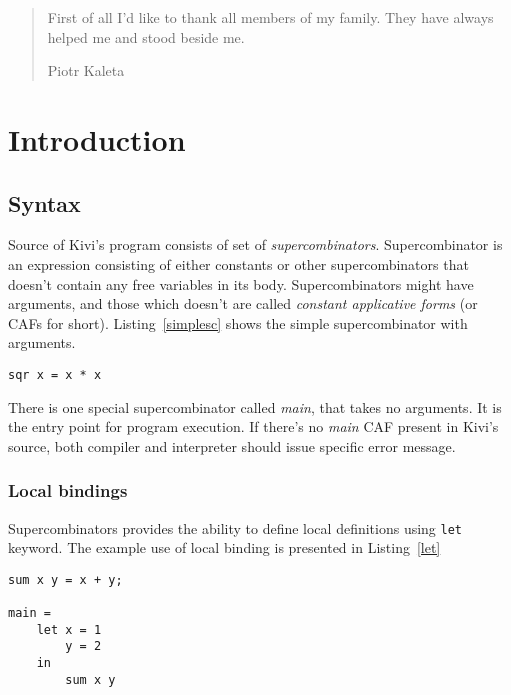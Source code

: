 \documentclass[a4paper]{report}
\begin{document}
\renewcommand{\abstractname}{Acknowledgements}
\begin{abstract}
\normalsize
\center
First of all I'd like to thank all members of my family. They have
always helped me and stood beside me.
\begin{flushright}
Piotr Kaleta
\end{flushright}
\end{abstract}

\normalsize
{}

\tableofcontents

\chapter{Introduction}

\section{Syntax}
Source of Kivi's program consists of set of
\textit{supercombinators}\cite{wiki:supercombinator}. Supercombinator is an
expression consisting of either constants or other supercombinators that
doesn't contain any free variables in its body. Supercombinators might have
arguments, and those which doesn't are called \textit{constant applicative forms}
(or CAFs for short). Listing~\ref{simplesc} shows the simple
supercombinator with arguments.

\begin{lstlisting}[label=simplesc,caption={Simple supercombinator.}]
sqr x = x * x
\end{lstlisting}

There is one special supercombinator called \textit{main}, that takes no
arguments. It is the entry point for program execution. If there's no
\textit{main} CAF present in Kivi's source, both compiler and interpreter
should issue specific error message.

\subsection{Local bindings}
Supercombinators provides the ability to define local definitions using \texttt{let} keyword.
The example use of local binding is presented in Listing~\ref{let}


\begin{lstlisting}[label=let,caption={Local \texttt{let} binding.}]
sum x y = x + y;

main =
    let x = 1
        y = 2
    in
        sum x y
\end{lstlisting}
\end{document}
